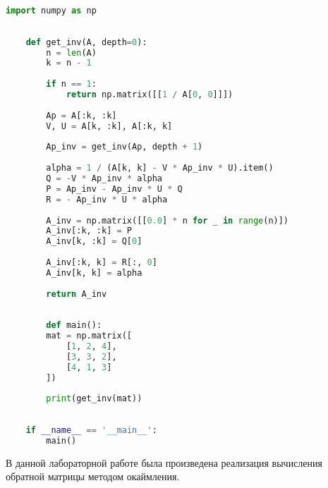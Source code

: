 \documentclass[14pt, a4paper, fleqn]{extarticle}
\begin{document}
	\begin{lstlisting}[language=Python, caption={Компьютерная реализация алгоритма}]
	import numpy as np
	
	
	def get_inv(A, depth=0):
		n = len(A)
		k = n - 1
	
		if n == 1:
			return np.matrix([[1 / A[0, 0]]])
	
		Ap = A[:k, :k]
		V, U = A[k, :k], A[:k, k]
	
		Ap_inv = get_inv(Ap, depth + 1)
	
		alpha = 1 / (A[k, k] - V * Ap_inv * U).item()
		Q = -V * Ap_inv * alpha
		P = Ap_inv - Ap_inv * U * Q
		R = - Ap_inv * U * alpha
	
		A_inv = np.matrix([[0.0] * n for _ in range(n)])
		A_inv[:k, :k] = P
		A_inv[k, :k] = Q[0]
	
		A_inv[:k, k] = R[:, 0]
		A_inv[k, k] = alpha
	
		return A_inv
	
	
		def main():
		mat = np.matrix([
			[1, 2, 4],
			[3, 3, 2],
			[4, 1, 3]
		])
	
		print(get_inv(mat))
	
	
	if __name__ == '__main__':
		main()
	\end{lstlisting}
	В данной лабораторной работе была произведена реализация вычисления обратной матрицы методом окаймления.
\end{document}
